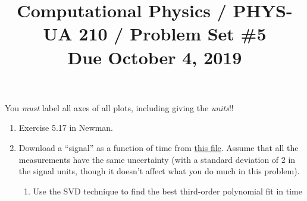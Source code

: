 \documentclass[11pt, preprint]{aastex}
\begin{document}
\title{\bf Computational Physics / PHYS-UA 210 / Problem Set \#5
\\ Due October 4, 2019 }

You {\it must} label all axes of all plots, including giving the {\it
  units}!!

\begin{enumerate}
  \item Exercise 5.17 in Newman.
  \item Download a ``signal'' as a function of time from
    \href{https://github.com/blanton144/computational-grad/blob/main/data/signal.dat}{this
      file}. Assume that all the measurements have the same
    uncertainty (with a standard deviation of 2 in the signal units,
    though it doesn't affect what you do much in this problem).
    \begin{enumerate}[a]
      \item Use the SVD technique to find the best third-order
        polynomial fit in time 
    \end{enumerate}
\end{enumerate}
\end{document}
